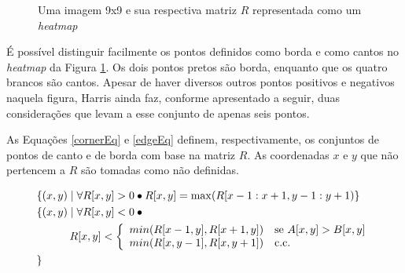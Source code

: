 \documentclass[12pt]{article}
\begin{document}
\begin{figure}[h]
  \centering
  \quad
  \caption{Uma imagem 9x9 e sua respectiva matriz $R$ representada
    como um \textit{heatmap}\label{figR}}
\end{figure}

É possível distinguir facilmente os  pontos definidos como borda e como
cantos no \textit{heatmap} da Figura \ref{figR}. Os dois pontos pretos
são borda, enquanto que os  quatro brancos são cantos. Apesar de haver
diversos outros  pontos positivos  e negativos naquela  figura, Harris
ainda faz, conforme apresentado a seguir, duas considerações que levam
a esse conjunto de apenas seis pontos.

As Equações \ref{cornerEq} e \ref{edgeEq} definem, respectivamente, os
conjuntos de  pontos de canto  e de borda  com base na matriz  $R$. As
coordenadas $x$  e $y$ que  não pertencem a  $R$ são tomadas  como não
definidas.

\begin{align}
  &\{(x, y) \mid \forall R[x,y] > 0 \bullet R[x,y] = \max(R[x-1:x+1,y-1:y+1)\} \label{cornerEq} \\
  &\{
    (x, y) \mid \forall R[x,y] < 0 \bullet \mbox{} \nonumber \\
  & \quad\quad\quad R[x,y] < \left\{
      \begin{array}{l l}
        min(R[x-1,y], R[x+1,y]) & \mbox{se} \,\, A[x,y] > B[x,y]\\
        min(R[x,y-1], R[x,y+1]) & \mbox{c.c.}\\
      \end{array}
    \right. \label{edgeEq} \\
  &\} \nonumber
\end{align}
\end{document}
